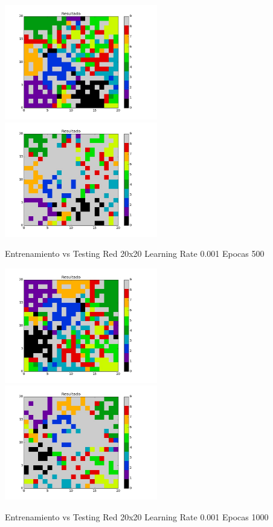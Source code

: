 \includegraphics[width=0.5\textwidth]{img/ej2_train_M_20_lrate_001_epocas_500}
\includegraphics[width=0.5\textwidth]{img/ej2_test_M_20_lrate_001_epocas_500}
{\center \footnotesize Entrenamiento vs Testing Red 20x20 Learning Rate 0.001 Epocas 500\par}
\includegraphics[width=0.5\textwidth]{img/ej2_train_M_20_lrate_001_epocas_1000}
\includegraphics[width=0.5\textwidth]{img/ej2_test_M_20_lrate_001_epocas_1000}
{\center \footnotesize Entrenamiento vs Testing Red 20x20 Learning Rate 0.001 Epocas 1000\par}

